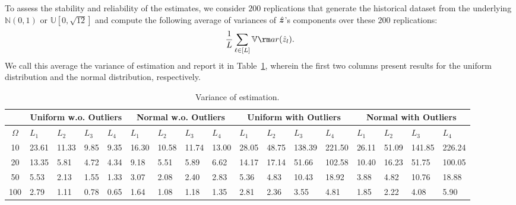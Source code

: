 \documentclass[opre, nonblindrev]{informswp}
\newcommand{\1}[1]{\mathds{1}{\left(#1\right)}}
\begin{document}
To assess the stability and reliability of the estimates, we consider $200$ replications that generate the historical dataset from the underlying $\mathbb{N}(0,1)$ or $\mathbb{U}[0,\sqrt{12}]$ and compute the following average of variances of $\hat{\bm{z}}$'s components over these $200$ replications:
\[
\frac{1}{L} \sum_{\ell \in [L]} \mathbb{V}{\rm ar}(\hat{z}_l).
\]
We call this average the variance of estimation and report it in Table~\ref{tab:estimation_normal_uniform}, wherein the first two columns present results for the uniform distribution and the normal distribution, respectively. 

\begin{table}[htb]
\scriptsize
\centering
\begin{tabularx}{1.0\textwidth}
{>{\hspace{-5pt}}c<{\hspace{-3pt}}||XXXX|XXXX|XXXX|XXXX}
\hline \hline
&\multicolumn{4}{c|}{Uniform w.o. Outliers} & \multicolumn{4}{c|}{Normal w.o. Outliers} &\multicolumn{4}{c|}{Uniform with Outliers} & \multicolumn{4}{c}{Normal with Outliers}  \\
\cline{2-17}
$\Omega$ & $L_1$ & $L_{2}$ & $L_3$ & $L_{4}$ & $L_1$ & $L_{2}$ & $L_3$ & $L_{4}$ & $L_1$ & $L_{2}$ & $L_3$ & $L_{4}$ & $L_1$ & $L_{2}$ & $L_3$ & $L_{4}$   \\
\hline
10  & 23.61   & 11.33 & 9.85 & 9.35 & 16.30  & 10.58 & 11.74 & 13.00 & 28.05             & 48.75 & 138.39 & 221.50 & 26.11            & 51.09 & 141.85 & 226.24 \\
20  & 13.35   & 5.81  & 4.72 & 4.34 & 9.18   & 5.51  & 5.89  & 6.62  & 14.17             & 17.14 & 51.66  & 102.58 & 10.40            & 16.23 & 51.75  & 100.05 \\
50  & 5.53    & 2.13  & 1.55 & 1.33 & 3.07   & 2.08  & 2.40  & 2.83  & 5.36              & 4.83  & 10.43  & 18.92  & 3.88             & 4.82  & 10.76  & 18.88  \\
100 & 2.79    & 1.11  & 0.78 & 0.65 & 1.64   & 1.08  & 1.18  & 1.35  & 2.81              & 2.36  & 3.55   & 4.81   & 1.85             & 2.22  & 4.08   & 5.90   \\
\hline \hline
\end{tabularx}
\vspace{4 pt}
\caption{Variance of estimation.}
\label{tab:estimation_normal_uniform}
\end{table}
\end{document}
